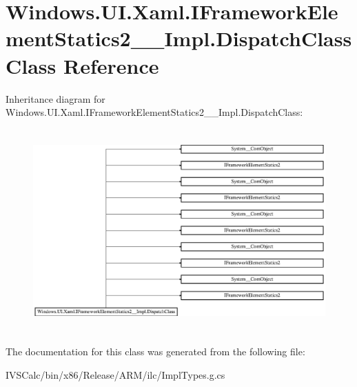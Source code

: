 \hypertarget{class_windows_1_1_u_i_1_1_xaml_1_1_i_framework_element_statics2_____impl_1_1_dispatch_class}{}\section{Windows.\+U\+I.\+Xaml.\+I\+Framework\+Element\+Statics2\+\_\+\+\_\+\+Impl.\+Dispatch\+Class Class Reference}
\label{class_windows_1_1_u_i_1_1_xaml_1_1_i_framework_element_statics2_____impl_1_1_dispatch_class}
Inheritance diagram for Windows.\+U\+I.\+Xaml.\+I\+Framework\+Element\+Statics2\+\_\+\+\_\+\+Impl.\+Dispatch\+Class\+:\begin{figure}[H]
\begin{center}
\leavevmode
\includegraphics[height=7.797468cm]{class_windows_1_1_u_i_1_1_xaml_1_1_i_framework_element_statics2_____impl_1_1_dispatch_class}
\end{center}
\end{figure}


The documentation for this class was generated from the following file\+:\begin{DoxyCompactItemize}
\item 
I\+V\+S\+Calc/bin/x86/\+Release/\+A\+R\+M/ilc/Impl\+Types.\+g.\+cs\end{DoxyCompactItemize}
